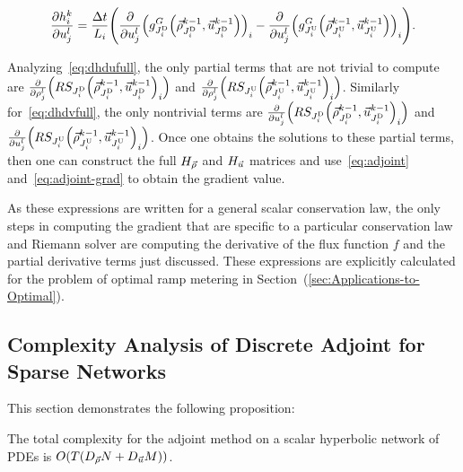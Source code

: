 \begin{equation}
\pfrac{\syseq_{\link}^{\tind}}{\condiscrete jl}=\frac{\Delta t}{L_{i}}\left(\pfrac{}{\condiscrete jl}\left(\god_{\jdown{\link}}\left(\juncstate{\jdown{\link}}{\tind-1},\junccon{\jdown{\link}}{\tind-1}\right)\right)_{\link}-\pfrac{}{\condiscrete jl}\left(\god_{\jup{\link}}\left(\juncstate{\jup{\link}}{\tind-1},\junccon{\jup{\link}}{\tind-1}\right)\right)_{\link}\right)\label{eqdhdvgod}.
\end{equation}


Analyzing~\eqref{eq:dhdufull}, the only partial terms that are not
trivial to compute are $\pfrac{}{\discrete jl}\left(\RS_{\jdown{\link}}\left(\juncstate{\jdown{\link}}{\tind-1},\junccon{\jdown{\link}}{\tind-1}\right)_{\link}\right)$
and $\pfrac{}{\discrete jl}\left(\RS_{\jup{\link}}\left(\juncstate{\jup{\link}}{\tind-1},\junccon{\jup{\link}}{\tind-1}\right)_{\link}\right)$.
Similarly for~\eqref{eq:dhdvfull}, the only nontrivial terms are
$\pfrac{}{\condiscrete jl}\left(\RS_{\jdown{\link}}\left(\juncstate{\jdown{\link}}{\tind-1},\junccon{\jdown{\link}}{\tind-1}\right)_{\link}\right)$
and $\pfrac{}{\condiscrete jl}\left(\RS_{\jup{\link}}\left(\juncstate{\jup{\link}}{\tind-1},\junccon{\jup{\link}}{\tind-1}\right)_{\link}\right)$.
Once one obtains the solutions to these partial terms, then one can
construct the full $H_{\vec{\rho}}$ and $H_{\vec{u}}$ matrices and use~\eqref{eq:adjoint}
and~\eqref{eq:adjoint-grad} to obtain the gradient value.

As these expressions are written for a general scalar conservation
law, the only steps in computing the gradient that are specific to
a particular conservation law and Riemann solver are computing the
derivative of the flux function $f$ and the partial derivative terms
just discussed. These expressions are explicitly calculated for the
problem of optimal ramp metering in Section~(\ref{sec:Applications-to-Optimal}).


\subsection{Complexity Analysis of Discrete Adjoint for Sparse Networks}
\label{sub:Complexity-of-solving}

This section demonstrates the following proposition:

\begin{prop}
\textup{The total complexity for the adjoint method on a scalar hyperbolic
network of PDEs is }$O(\ntime\left(\DegreeSymbol{\state}\nlinks+\DegreeSymbol{\control}\ncontrols\right))$.\end{prop}

